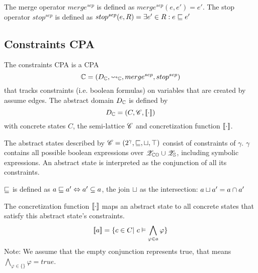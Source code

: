 The merge operator $merge^{sep}$ is defined as $merge^{sep}(e, e') = e'$.
The stop operator $stop^{sep}$ is defined as $stop^{sep}(e, R) = \exists e' \in R: e \sqsubseteq e'$
\subsection{Constraints CPA}

The constraints CPA is a CPA \[\mathbb{C} = (D_{\mathbb{C}}, \rightsquigarrow_{\mathbb{C}}, merge^{sep}, stop^{sep})\] that tracks constraints (i.e. boolean formulas) on variables that are created by assume edges.
The abstract domain $D_{\mathbb{C}}$ is defined by 
\[D_{\mathbb{C}} = (C, \mathscr{C}, [\![ \cdot ]\!])\]
with concrete states $C$, the semi-lattice $\mathscr{C}$ and concretization function $[\![ \cdot ]\!]$.

The abstract states described by $\mathscr{C} = (2^\gamma, \sqsubseteq, \sqcup, \top)$ consist of constraints of $\gamma$.
$\gamma$ contains all possible boolean expressions over $\mathscr{Z}_{\mathbb{CO}} \cup \mathscr{Z}_{\mathbb{S}}$, including symbolic expressions.
An abstract state is interpreted as the conjunction of all its constraints.

$\sqsubseteq$ is defined as $a \sqsubseteq a' \Leftrightarrow a' \subseteq a$,
the join $\sqcup$ as the intersection: $a \sqcup a' = a \cap a'$

The concretization function $[\![ \cdot ]\!]$ maps an abstract state to all concrete states that satisfy this abstract state's constraints.
        \[ [\![ a ]\!] = \{ c \in C |\ c \vDash \displaystyle\bigwedge_{\varphi \in a} \varphi \} \]
        Note: We assume that the empty conjunction represents true, that means $\displaystyle\bigwedge_{\varphi \in \{\}} \varphi = true$.

